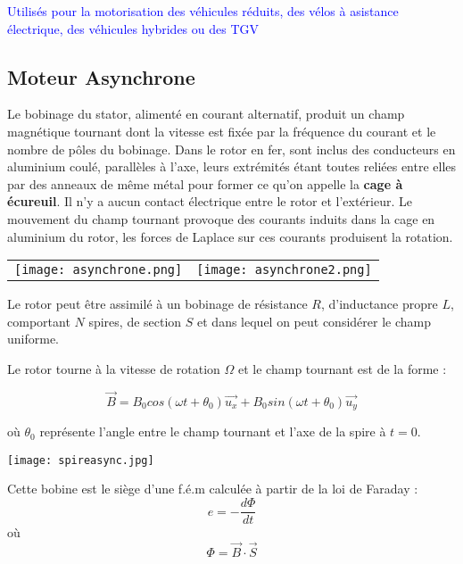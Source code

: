 \documentclass{article}
\begin{document}
\textcolor{blue}{Utilisés pour la motorisation des véhicules réduits, des vélos à asistance électrique, des véhicules hybrides ou des TGV}




\subsection{Moteur Asynchrone}

Le bobinage du stator, alimenté en courant alternatif, produit un champ magnétique tournant dont la vitesse est fixée par la fréquence du courant et le nombre de pôles du bobinage. Dans le rotor en fer, sont inclus des conducteurs en aluminium coulé, parallèles à l’axe, leurs extrémités étant toutes reliées entre elles par des anneaux de même métal pour former ce qu’on appelle la \textbf{cage à écureuil}. Il n’y a aucun contact électrique entre le rotor et l’extérieur. Le mouvement du champ tournant provoque des courants induits dans la cage en aluminium du rotor, les forces de Laplace sur ces courants produisent la rotation.\medskip


\begin{tabular}{cc}
   \texttt{[image: asynchrone.png]} &
   \texttt{[image: asynchrone2.png]} \\
\end{tabular}


\medskip

Le rotor peut être assimilé à un bobinage de résistance $R$, d'inductance propre $L$, comportant $N$ spires, de section $S$ et dans lequel on peut considérer le champ uniforme.\medskip

Le rotor tourne à la vitesse de rotation $\Omega$ et le champ tournant est de la forme :

\begin{equation}
    \vec{B} = B_0 cos(\omega t + \theta_0) \vec{u_x} + B_0 sin(\omega t + \theta_0 ) \vec{u_y}
\end{equation}

où $\theta_0$ représente l'angle entre le champ tournant et l'axe de la spire à $t=0$.

\begin{center}
    \texttt{[image: spireasync.jpg]}
\end{center}

Cette bobine est le siège d'une f.é.m calculée à partir de la loi de Faraday :
\begin{equation}
    e =- \frac{d\Phi}{dt} 
\end{equation}
où 
\begin{equation}
    \Phi = \vec{B} \cdot \vec{S}
\end{equation}
\end{document}
